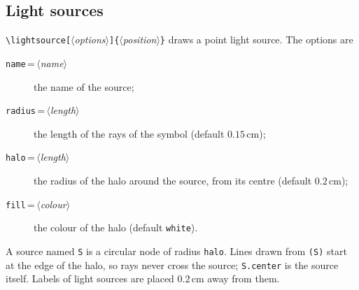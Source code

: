 \documentclass[a4paper,11pt]{article}
\newcommand\cs[1]{\texttt{\textbackslash#1}}
\newcommand\key[1]{\texttt{#1}}
\newcommand\marg[1]{\texttt{\{}\meta{#1}\texttt{\}}}
\newcommand\oarg[1]{\texttt{[}\meta{#1}\texttt{]}}
\newcommand\meta[1]{\ensuremath{\langle}\textit{#1}\ensuremath{\rangle}}
\newcommand\showanchor[3][right]{%
  \fill[red] #2 circle[radius=0.8pt]
    node[#1, font=\scriptsize\ttfamily, text=red!70!black, inner sep=1.5pt] {#3};}
\newcommand\showanchorat[4][right]{%
  \draw[red, ultra thin] #2 -- #3;
  \showanchor[#1]{#2}{}\path #3 node[#1, font=\scriptsize\ttfamily,
    text=red!70!black, inner sep=1.5pt] {#4};}
\newenvironment{anchors}
  {\begin{tcolorbox}[colback=white, colframe=black!30, boxrule=0.4pt, arc=1mm,
     halign=center, title={\small anchors}, coltitle=black, colbacktitle=black!8]}
  {\end{tcolorbox}}
\begin{document}
\subsection{Light sources}
\cs{lightsource}\oarg{options}\marg{position} draws a point light source.
The options are
\begin{description}
  \item[\key{name}\,=\,\meta{name}] the name of the source;
  \item[\key{radius}\,=\,\meta{length}] the length of the rays of the symbol
    (default \(0.15\,\mathrm{cm}\));
  \item[\key{halo}\,=\,\meta{length}] the radius of the halo around the
    source, from its centre (default \(0.2\,\mathrm{cm}\));
  \item[\key{fill}\,=\,\meta{colour}] the colour of the halo (default
    \texttt{white}).
\end{description}
A source named \texttt{S} is a circular node of radius \key{halo}. Lines
drawn from \texttt{(S)} start at the edge of the halo, so rays never cross
the source; \texttt{S.center} is the source itself. Labels of light sources
are placed \(0.2\,\mathrm{cm}\) away from them.
\begin{example}
\end{example}
\begin{anchors}
\end{anchors}
\end{document}
